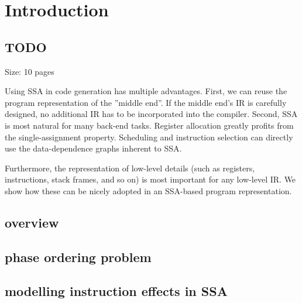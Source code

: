 \chapter{Introduction }
\section{TODO}


Size: 10 pages

Using SSA in code generation has multiple advantages.
First, we can reuse the program representation of the ''middle end''.
If the middle end's IR is carefully designed, no additional IR has to be incorporated into the compiler.
Second, SSA is most natural for many back-end tasks.
Register allocation greatly profits from the single-assignment property.
Scheduling and instruction selection can directly use the data-dependence graphs inherent to SSA.

Furthermore, the representation of low-level details (such as registers, instructions, stack frames, and so on) is most important for any low-level IR.
We show how these can be nicely adopted in an SSA-based program representation.

\section{overview}
\section{phase ordering problem}
\section{modelling instruction effects in SSA}
